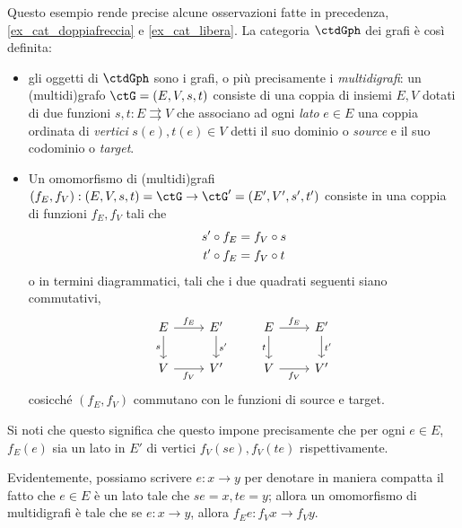 \begin{example}\label{ex_cat_grafi}
	Questo esempio rende precise alcune osservazioni fatte in precedenza, \ref{ex_cat_doppiafreccia} e \ref{ex_cat_libera}. La categoria \(\ctdGph\) dei grafi è così definita:
	\begin{itemize}
		\item gli oggetti di \(\ctdGph\) sono i grafi, o più precisamente i \emph{multidigrafi}: un (multidi)grafo \(\ctG = (E,V,s,t)\) consiste di una coppia di insiemi \(E,V\) dotati di due funzioni \(s,t : E\rightrightarrows V\) che associano ad ogni \emph{lato} \(e\in E\) una coppia ordinata di \emph{vertici} \(s(e),t(e)\in V\) detti il suo dominio o \emph{source} e il suo codominio o \emph{target}.
		\item Un omomorfismo di (multidi)grafi \((f_E,f_V) : (E,V,s,t)=\ctG\to\ctG'= (E', V',s',t')\) consiste in una coppia di funzioni \(f_E, f_V\) tali che
		      \begin{gather*}
			      s'\circ f_E = f_V\circ s\\
			      t'\circ f_E = f_V\circ t
		      \end{gather*}
		      o in termini diagrammatici, tali che i due quadrati seguenti siano commutativi,
		      \[\begin{tikzcd}
				      E & {E'} & E & {E'} \\
				      V & {V'} & V & {V'}
				      \arrow["{f_E}", from=1-1, to=1-2]
				      \arrow["{s'}", from=1-2, to=2-2]
				      \arrow["{f_V}"', from=2-1, to=2-2]
				      \arrow["s"', from=1-1, to=2-1]
				      \arrow["{f_E}", from=1-3, to=1-4]
				      \arrow["{f_V}"', from=2-3, to=2-4]
				      \arrow["{t'}", from=1-4, to=2-4]
				      \arrow["t"', from=1-3, to=2-3]
			      \end{tikzcd}\]
		      cosicché \((f_E,f_V)\) commutano con le funzioni di source e target.
	\end{itemize}
	Si noti che questo significa che questo impone precisamente che per ogni \(e\in E\), \(f_E(e)\) sia un lato in \(E'\) di vertici \(f_V(se), f_V(te)\) rispettivamente.
\end{example}
Evidentemente, possiamo scrivere \(e : x\to y\) per denotare in maniera compatta il fatto che \(e \in E\) è un lato tale che \(se=x,te=y\); allora un omomorfismo di multidigrafi è tale che se \(e : x\to y\), allora \(f_Ee : f_Vx\to f_Vy\).
